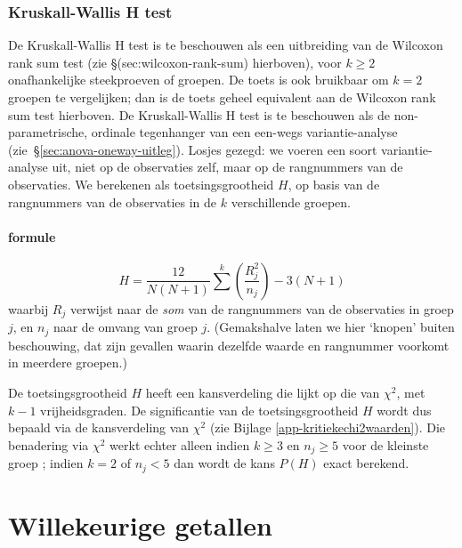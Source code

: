 \documentclass[
]{book}
\begin{document}
\subsection{Kruskall-Wallis H test}\label{kruskall-wallis-h-test}

De Kruskall-Wallis H test is te beschouwen als een uitbreiding van de
Wilcoxon rank sum test (zie
§(sec:wilcoxon-rank-sum) hierboven), voor \(k \ge 2\) onafhankelijke
steekproeven of groepen. De toets is ook bruikbaar om \(k=2\) groepen te
vergelijken; dan is de toets geheel equivalent aan de Wilcoxon rank sum
test hierboven. De Kruskall-Wallis H test is te beschouwen als de
non-parametrische, ordinale tegenhanger van een een-wegs
variantie-analyse
(zie~§\ref{sec:anova-oneway-uitleg}). Losjes gezegd: we voeren een
soort variantie-analyse uit, niet op de observaties zelf, maar op de
rangnummers van de observaties. We berekenen als toetsingsgrootheid \(H\),
op basis van de rangnummers van de observaties in de \(k\) verschillende
groepen.

\subsubsection{formule}\label{formule}

\begin{equation}
  \label{eq:kruskall-wallis-H}
    H = \frac{12}{N(N+1)} \sum^{k} (\frac{R^2_j}{n_j}) - 3(N+1)
\end{equation}
waarbij \(R_j\) verwijst naar de \emph{som} van de rangnummers van de
observaties in groep \(j\), en \(n_j\) naar de omvang van groep \(j\).
(Gemakshalve laten we hier `knopen' buiten beschouwing, dat zijn
gevallen waarin dezelfde waarde en rangnummer voorkomt in meerdere
groepen.)

De toetsingsgrootheid \(H\) heeft een kansverdeling die lijkt op die van
\(\chi^2\), met \(k-1\) vrijheidsgraden. De significantie van de
toetsingsgrootheid \(H\) wordt dus bepaald via de kansverdeling van
\(\chi^2\) (zie Bijlage \ref{app-kritiekechi2waarden}).
Die benadering via \(\chi^2\) werkt echter alleen indien \(k\ge3\)
en \(n_j\ge5\) voor de kleinste groep \citep{Ferg89}; indien \(k=2\) of \(n_j<5\)
dan wordt de kans \(P(H)\) exact berekend.

\appendix


\chapter{Willekeurige getallen}\label{app-randomgetallen}
\end{document}
